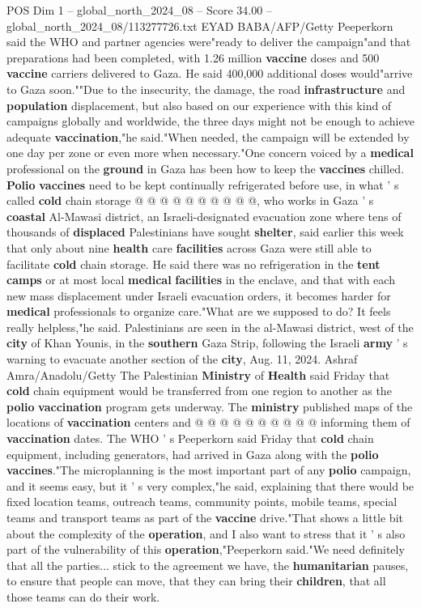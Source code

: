 \begin{textsample}{POS Dim 1 – global\_north\_2024\_08 – Score 34.00 – global\_north\_2024\_08/113277726.txt}
EYAD BABA/AFP/Getty Peeperkorn said the WHO and partner agencies were"ready to deliver the campaign"and that preparations had been completed, with 1.26 million \textbf{vaccine} doses and 500 \textbf{vaccine} carriers delivered to Gaza.
He said 400,000 additional doses would"arrive to Gaza soon.""Due to the insecurity, the damage, the road \textbf{infrastructure} and \textbf{population} displacement, but also based on our experience with this kind of campaigns globally and worldwide, the three days might not be enough to achieve adequate \textbf{vaccination},"he said."When needed, the campaign will be extended by one day per zone or even more when necessary."One concern voiced by a \textbf{medical} professional on the \textbf{ground} in Gaza has been how to keep the \textbf{vaccines} chilled. \textbf{Polio} \textbf{vaccines} need to be kept continually refrigerated before use, in what ' s called \textbf{cold} chain storage @ @ @ @ @ @ @ @ @ @, who works in Gaza ' s \textbf{coastal} Al-Mawasi district, an Israeli-designated evacuation zone where tens of thousands of \textbf{displaced} Palestinians have sought \textbf{shelter}, said earlier this week that only about nine \textbf{health} care \textbf{facilities} across Gaza were still able to facilitate \textbf{cold} chain storage.
He said there was no refrigeration in the \textbf{tent} \textbf{camps} or at most local \textbf{medical} \textbf{facilities} in the enclave, and that with each new mass displacement under Israeli evacuation orders, it becomes harder for \textbf{medical} professionals to organize care."What are we supposed to do?
It feels really helpless,"he said.
Palestinians are seen in the al-Mawasi district, west of the \textbf{city} of Khan Younis, in the \textbf{southern} Gaza Strip, following the Israeli \textbf{army} ' s warning to evacuate another section of the \textbf{city}, Aug. 11, 2024.
Ashraf Amra/Anadolu/Getty The Palestinian \textbf{Ministry} of \textbf{Health} said Friday that \textbf{cold} chain equipment would be transferred from one region to another as the \textbf{polio} \textbf{vaccination} program gets underway.
The \textbf{ministry} published maps of the locations of \textbf{vaccination} centers and @ @ @ @ @ @ @ @ @ @ informing them of \textbf{vaccination} dates.
The WHO ' s Peeperkorn said Friday that \textbf{cold} chain equipment, including generators, had arrived in Gaza along with the \textbf{polio} \textbf{vaccines}."The microplanning is the most important part of any \textbf{polio} campaign, and it seems easy, but it ' s very complex,"he said, explaining that there would be fixed location teams, outreach teams, community points, mobile teams, special teams and transport teams as part of the \textbf{vaccine} drive."That shows a little bit about the complexity of the \textbf{operation}, and I also want to stress that it ' s also part of the vulnerability of this \textbf{operation},"Peeperkorn said."We need definitely that all the parties... stick to the agreement we have, the \textbf{humanitarian} pauses, to ensure that people can move, that they can bring their \textbf{children}, that all those teams can do their work.

\end{textsample}
